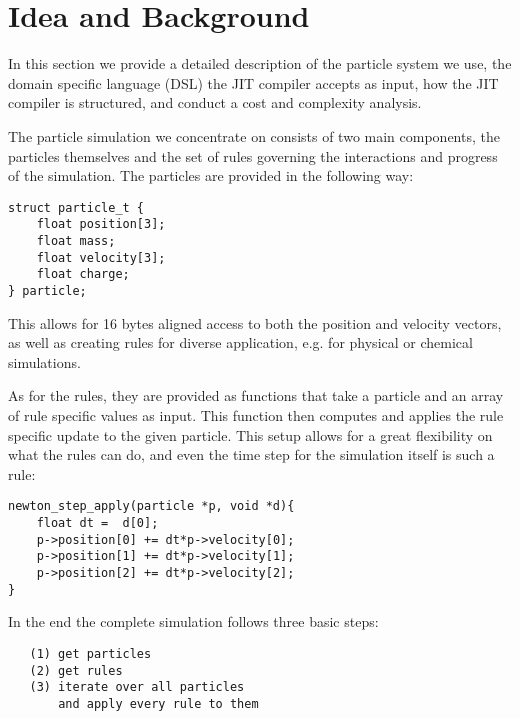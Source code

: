 \section{Idea and Background}\label{sec:background}

In this section we provide a detailed description of the particle system we use, the domain specific language (DSL) the JIT compiler accepts as input, how the JIT compiler is structured, and conduct a cost and complexity analysis.

The particle simulation we concentrate on consists of two main components, the particles themselves and the set of rules governing the interactions and progress of the simulation. The particles are provided in the following way:

\noindent\begin{minipage}{\linewidth}
\begin{lstlisting}
struct particle_t {
    float position[3];
    float mass;
    float velocity[3];
    float charge;
} particle;
\end{lstlisting}
\end{minipage}

This allows for 16 bytes aligned access to both the position and velocity vectors, as well as creating rules for diverse application, e.g. for physical or chemical simulations.

As for the rules, they are provided as functions that take a particle and an array of rule specific values as input.
This function then computes and applies the rule specific update to the given particle. This setup allows for a great flexibility on what the rules can do, and even the time step for the simulation itself is such a rule:

\noindent\begin{minipage}{\linewidth}
\begin{lstlisting}
newton_step_apply(particle *p, void *d){
    float dt =  d[0];
    p->position[0] += dt*p->velocity[0];
    p->position[1] += dt*p->velocity[1];
    p->position[2] += dt*p->velocity[2];
}
\end{lstlisting}
\end{minipage}

In the end the complete simulation follows three basic steps:
\begin{lstlisting}
   (1) get particles
   (2) get rules
   (3) iterate over all particles 
       and apply every rule to them
\end{lstlisting}

